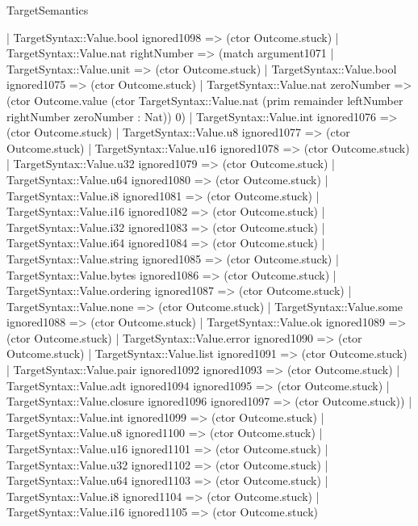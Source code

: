 \begin{lexlean}{TargetSemantics}
\begin{semanticmodule}
{                | TargetSyntax::Value.bool ignored1098 => (ctor Outcome.stuck)
                | TargetSyntax::Value.nat rightNumber => (match argument1071
                  | TargetSyntax::Value.unit => (ctor Outcome.stuck)
                  | TargetSyntax::Value.bool ignored1075 => (ctor Outcome.stuck)
                  | TargetSyntax::Value.nat zeroNumber => (ctor Outcome.value (ctor TargetSyntax::Value.nat (prim remainder leftNumber rightNumber zeroNumber : Nat)) 0)
                  | TargetSyntax::Value.int ignored1076 => (ctor Outcome.stuck)
                  | TargetSyntax::Value.u8 ignored1077 => (ctor Outcome.stuck)
                  | TargetSyntax::Value.u16 ignored1078 => (ctor Outcome.stuck)
                  | TargetSyntax::Value.u32 ignored1079 => (ctor Outcome.stuck)
                  | TargetSyntax::Value.u64 ignored1080 => (ctor Outcome.stuck)
                  | TargetSyntax::Value.i8 ignored1081 => (ctor Outcome.stuck)
                  | TargetSyntax::Value.i16 ignored1082 => (ctor Outcome.stuck)
                  | TargetSyntax::Value.i32 ignored1083 => (ctor Outcome.stuck)
                  | TargetSyntax::Value.i64 ignored1084 => (ctor Outcome.stuck)
                  | TargetSyntax::Value.string ignored1085 => (ctor Outcome.stuck)
                  | TargetSyntax::Value.bytes ignored1086 => (ctor Outcome.stuck)
                  | TargetSyntax::Value.ordering ignored1087 => (ctor Outcome.stuck)
                  | TargetSyntax::Value.none => (ctor Outcome.stuck)
                  | TargetSyntax::Value.some ignored1088 => (ctor Outcome.stuck)
                  | TargetSyntax::Value.ok ignored1089 => (ctor Outcome.stuck)
                  | TargetSyntax::Value.error ignored1090 => (ctor Outcome.stuck)
                  | TargetSyntax::Value.list ignored1091 => (ctor Outcome.stuck)
                  | TargetSyntax::Value.pair ignored1092 ignored1093 => (ctor Outcome.stuck)
                  | TargetSyntax::Value.adt ignored1094 ignored1095 => (ctor Outcome.stuck)
                  | TargetSyntax::Value.closure ignored1096 ignored1097 => (ctor Outcome.stuck))
                | TargetSyntax::Value.int ignored1099 => (ctor Outcome.stuck)
                | TargetSyntax::Value.u8 ignored1100 => (ctor Outcome.stuck)
                | TargetSyntax::Value.u16 ignored1101 => (ctor Outcome.stuck)
                | TargetSyntax::Value.u32 ignored1102 => (ctor Outcome.stuck)
                | TargetSyntax::Value.u64 ignored1103 => (ctor Outcome.stuck)
                | TargetSyntax::Value.i8 ignored1104 => (ctor Outcome.stuck)
                | TargetSyntax::Value.i16 ignored1105 => (ctor Outcome.stuck)
}
\end{semanticmodule}
\end{lexlean}
